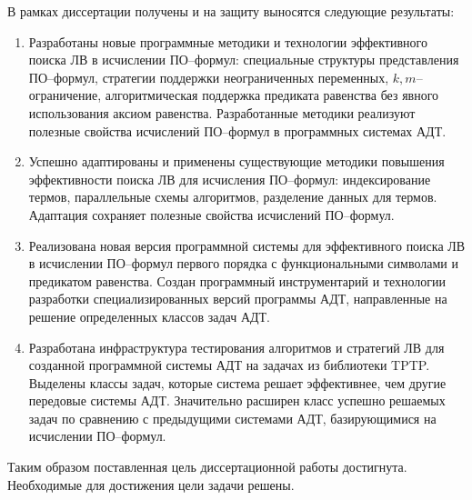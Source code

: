 В рамках диссертации получены и на защиту выносятся следующие результаты:
\begin{enumerate}
\item Разработаны новые программные методики и технологии эффективного поиска ЛВ в исчислении ПО--формул: специальные структуры представления ПО--формул, стратегии поддержки неограниченных переменных, $k,m$--огра\-ни\-че\-ние, алгоритмическая поддержка предиката равенства без явного использования аксиом равенства. Разработанные методики реализуют полезные свойства исчислений ПО--формул в программных системах АДТ.

\item Успешно адаптированы и применены существующие методики повышения эффективности поиска ЛВ для исчисления ПО--формул: индексирование термов, параллельные схемы алгоритмов, разделение данных для термов. Адаптация сохраняет полезные свойства исчислений ПО--формул.

\item Реализована новая версия программной системы для эффективного поиска ЛВ в исчислении ПО--формул первого порядка с функциональными символами и предикатом равенства. Создан программный инструментарий и технологии разработки специализированных версий программы АДТ, направленные на решение определенных классов задач АДТ. %

\item Разработана инфраструктура тестирования алгоритмов и стратегий ЛВ для созданной программной системы АДТ на задачах из библиотеки TPTP. Выделены классы задач, которые система решает эффективнее, чем другие передовые системы АДТ. Значительно расширен класс успешно решаемых задач по сравнению с предыдущими системами АДТ, базирующимися на исчислении ПО--формул.
\end{enumerate}

Таким образом поставленная цель диссертационной работы достигнута. Необходимые для достижения цели задачи решены.


